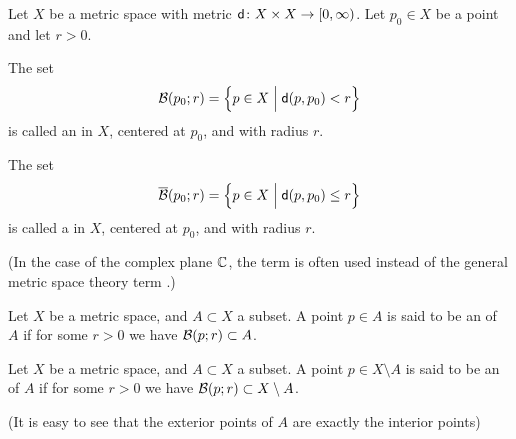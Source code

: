 \begin{definition}
  \label{def:ball}
  Let $X$ be a metric space with metric $\genmet \colon X \times X \to [0,\infty)$.
  Let $p_0 \in X$ be a point and let $r>0$.

  The set
  \begin{align*}
    \BallRC{r}{p_0} = \Big\{ p \in X \; \Big| \; \genmet(p,p_0) < r \Big\}
  \end{align*}
  is called an  in $X$, centered at $p_0$, and with radius $r$.

  The set
  \begin{align*}
    \CBallRC{r}{p_0} = \Big\{ p \in X \; \Big| \; \genmet(p,p_0) \le r \Big\}
  \end{align*}
  is called a  in $X$, centered at $p_0$, and with radius $r$.


  (In the case of the complex plane $\bC$, the term 
  is often used instead of the general metric space theory term .)
\end{definition}

\begin{definition}
  \label{def:interior}
  Let $X$ be a metric space, and $A \subset X$ a subset.
  A point $p \in A$ is said to be an  of $A$
  if for some $r > 0$ we have $\BallRC{r}{p} \subset A$.
\end{definition}

\begin{definition}
  \label{def:exterior}
  Let $X$ be a metric space, and $A \subset X$ a subset.
  A point $p \in X \setminus A$ is said to be an  of $A$
  if for some $r > 0$ we have $\BallRC{r}{p} \subset X \setminus A$.

  (It is easy to see that the exterior points of $A$ are exactly the interior
  points)
\end{definition}

